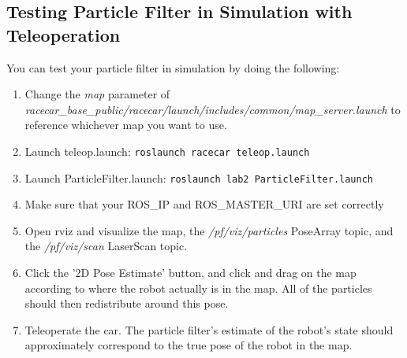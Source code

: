 \documentclass[final]{article}
\begin{document}
\subsection{Testing Particle Filter in Simulation with Teleoperation}
\label{sec:test_pf_sim_teleop}
You can test your particle filter in simulation by doing the following:

\begin{enumerate}

\item Change the \textit{map} parameter of \textit{racecar\_base\_public/racecar/launch/includes/common/map\_server.launch} to reference whichever map you want to use.
\item Launch teleop.launch: \texttt{roslaunch racecar teleop.launch}
\item Launch ParticleFilter.launch: \texttt{roslaunch lab2 ParticleFilter.launch}
\item Make sure that your ROS\_IP and ROS\_MASTER\_URI are set correctly
\item Open rviz and visualize the map, the \textit{/pf/viz/particles} PoseArray topic, and the \textit{/pf/viz/scan} LaserScan topic.
\item Click the '2D Pose Estimate' button, and click and drag on the map according to where the robot actually is in the map. All of the particles should then redistribute around this pose.
\item Teleoperate the car. The particle filter's estimate of the robot's state should approximately correspond to the true pose of the robot in the map.
\end{enumerate}
\end{document}
